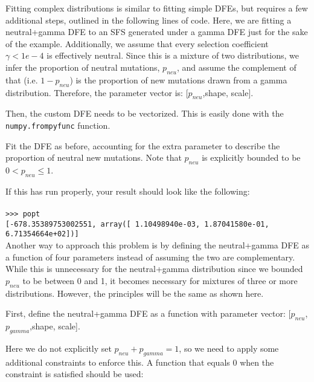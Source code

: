 \documentclass[11pt]{article}
\begin{document}
Fitting complex distributions is similar to fitting simple DFEs, but requires a few additional steps, outlined in the following lines of code. Here, we are fitting a neutral+gamma DFE to an SFS generated under a gamma DFE just for the sake of the example. Additionally, we assume that every selection coefficient $\gamma < 1e-4$ is effectively neutral. Since this is a mixture of two distributions, we infer the proportion of neutral mutations, $p_{neu}$, and assume the complement of that (i.e. $1-p_{neu}$) is the proportion of new mutations drawn from a gamma distribution. Therefore, the parameter vector is: [$p_{neu}$,shape, scale].



Then, the custom DFE needs to be vectorized. This is easily done with the \texttt{numpy.frompyfunc} function.



Fit the DFE as before, accounting for the extra parameter to describe the proportion of neutral new mutations. Note that $p_{neu}$ is explicitly bounded to be $0 < p_{neu} \leq 1$.



If this has run properly, your result should look like the following: \\ \\
\texttt{>>> popt} \\
\texttt{[-678.35389753002551, array([  1.10498940e-03,   1.87041580e-01,   6.71354664e+02])]} \\

Another way to approach this problem is by defining the neutral+gamma DFE as a function of four parameters instead of assuming the two are complementary. While this is unnecessary for the neutral+gamma distribution since we bounded $p_{neu}$ to be between 0 and 1, it becomes necessary for mixtures of three or more distributions. However, the principles will be the same as shown here. 

First, define the neutral+gamma DFE as a function with parameter vector: [$p_{neu}$,$p_{gamma}$,shape, scale]. 



Here we do not explicitly set $p_{neu} + p_{gamma} = 1$, so we need to apply some additional constraints to enforce this. A function that equals 0 when the constraint is satisfied should be used:
\end{document}
